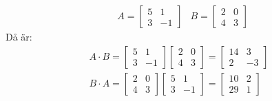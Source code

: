 \begin{Ex}
    \begin{align*}
    &A = \begin{bmatrix} 5&1\\3&-1 \end{bmatrix} &B = \begin{bmatrix} 2&0\\4&3 \end{bmatrix}
    \end{align*}
    Då är:
    \begin{gather*}
    	A \cdot B = \begin{bmatrix} 5&1\\3&-1 \end{bmatrix} \begin{bmatrix} 2&0\\4&3 \end{bmatrix} = \begin{bmatrix} 14&3\\2&-3 \end{bmatrix}\\
    	B \cdot A = \begin{bmatrix} 2&0\\4&3 \end{bmatrix} \begin{bmatrix} 5&1\\3&-1 \end{bmatrix} = \begin{bmatrix} 10&2\\29&1 \end{bmatrix}
    \end{gather*}
\end{Ex}

